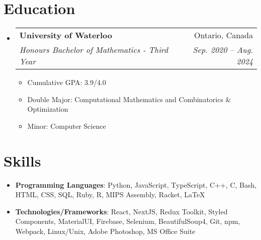 \documentclass[letterpaper,11pt]{article}
\makeatletter
\newcommand{\resumeSubheading}[4]{
  \vspace{-1pt}\item
    \begin{tabular*}{0.97\textwidth}{l@{\extracolsep{\fill}}r}
      \textbf{#1} & #2 \\
      \textit{\small#3} & \textit{\small #4} \\
    \end{tabular*}\vspace{0pt}
}
\newcommand{\resumeSubHeadingListStart}{\begin{itemize}[leftmargin=*]}
\newcommand{\resumeSubHeadingListEnd}{\end{itemize}}
\newcommand{\resumeItemListStart}{\begin{itemize}}
\newcommand{\resumeItemListEnd}{\end{itemize}\vspace{0pt}}
\makeatother
\begin{document}
\section{Education}
\resumeSubHeadingListStart
\resumeSubheading
{University of Waterloo}{Ontario, Canada}
{Honours Bachelor of Mathematics - Third Year}{Sep. 2020 -- Aug. 2024}
\begin{itemize}
	\item Cumulative GPA: 3.9/4.0
	\item Double Major: Computational Mathematics and Combinatorics \& Optimization
	\item Minor: Computer Science
\end{itemize}
\resumeSubHeadingListEnd


%
\section{Skills}
\resumeSubHeadingListStart
\item{
            \textbf{Programming Languages}{: Python, JavaScript, TypeScript, C++, C, Bash, HTML, CSS, SQL, Ruby, R, MIPS Assembly, Racket, LaTeX}
            \hfill
      }
\item{
            \textbf{Technologies/Frameworks}{: React, NextJS, Redux Toolkit, Styled Components, MaterialUI, Firebase, Selenium, BeautifulSoup4, Git, npm, Webpack, Linux/Unix, Adobe Photoshop, MS Office Suite}
      }
\resumeSubHeadingListEnd


\end{document}
